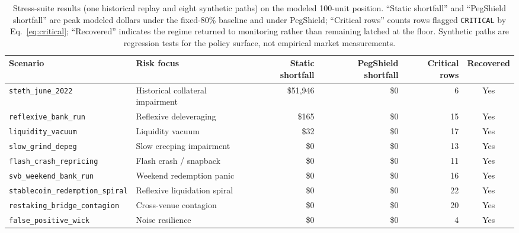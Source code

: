 \documentclass[aps,prx,reprint,nofootinbib,longbibliography]{revtex4-2}
\begin{document}
\begin{table}[t]
\caption{\label{tab:scenarios}Stress-suite results (one historical replay and eight
synthetic paths) on the modeled 100-unit position. ``Static shortfall'' and
``PegShield shortfall'' are peak modeled dollars under the fixed-80\% baseline and
under PegShield; ``Critical rows'' counts rows flagged \texttt{CRITICAL} by
Eq.~\eqref{eq:critical}; ``Recovered'' indicates the regime returned to monitoring
rather than remaining latched at the floor. Synthetic paths are regression tests
for the policy surface, not empirical market measurements.}
\centering
\footnotesize
\begin{tabular}{@{}llrrrc@{}}
\toprule
Scenario & Risk focus & Static shortfall & PegShield shortfall & Critical rows & Recovered \\
\midrule
\texttt{steth\_june\_2022} & Historical collateral impairment & \$51{,}946 & \$0 & 6 & Yes \\
\texttt{reflexive\_bank\_run} & Reflexive deleveraging & \$165 & \$0 & 15 & Yes \\
\texttt{liquidity\_vacuum} & Liquidity vacuum & \$32 & \$0 & 17 & Yes \\
\texttt{slow\_grind\_depeg} & Slow creeping impairment & \$0 & \$0 & 13 & Yes \\
\texttt{flash\_crash\_repricing} & Flash crash / snapback & \$0 & \$0 & 11 & Yes \\
\texttt{svb\_weekend\_bank\_run} & Weekend redemption panic & \$0 & \$0 & 16 & Yes \\
\texttt{stablecoin\_redemption\_spiral} & Reflexive liquidation spiral & \$0 & \$0 & 22 & Yes \\
\texttt{restaking\_bridge\_contagion} & Cross-venue contagion & \$0 & \$0 & 20 & Yes \\
\texttt{false\_positive\_wick} & Noise resilience & \$0 & \$0 & 4 & Yes \\
\bottomrule
\end{tabular}
\end{table}
\end{document}
